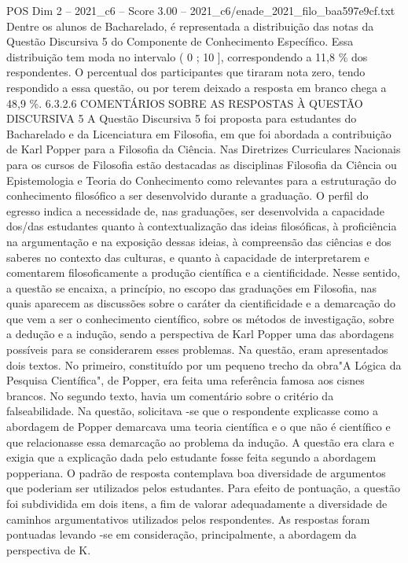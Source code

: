 \begin{textsample}{POS Dim 2 – 2021\_c6 – Score 3.00 – 2021\_c6/enade\_2021\_filo\_baa597e9cf.txt}
Dentre os alunos de Bacharelado, é representada a distribuição das notas da Questão Discursiva 5 do Componente de Conhecimento Específico.
Essa distribuição tem moda no intervalo ( 0 ; 10 ], correspondendo a 11,8 \% dos respondentes.
O percentual dos participantes que tiraram nota zero, tendo respondido a essa questão, ou por terem deixado a resposta em branco chega a 48,9 \%. 6.3.2.6 COMENTÁRIOS SOBRE AS RESPOSTAS À QUESTÃO DISCURSIVA 5 A Questão Discursiva 5 foi proposta para estudantes do Bacharelado e da Licenciatura em Filosofia, em que foi abordada a contribuição de Karl Popper para a Filosofia da Ciência.
Nas Diretrizes Curriculares Nacionais para os cursos de Filosofia estão destacadas as disciplinas Filosofia da Ciência ou Epistemologia e Teoria do Conhecimento como relevantes para a estruturação do conhecimento filosófico a ser desenvolvido durante a graduação.
O perfil do egresso indica a necessidade de, nas graduações, ser desenvolvida a capacidade dos/das estudantes quanto à contextualização das ideias filosóficas, à proficiência na argumentação e na exposição dessas ideias, à compreensão das ciências e dos saberes no contexto das culturas, e quanto à capacidade de interpretarem e comentarem filosoficamente a produção científica e a cientificidade.
Nesse sentido, a questão se encaixa, a princípio, no escopo das graduações em Filosofia, nas quais aparecem as discussões sobre o caráter da cientificidade e a demarcação do que vem a ser o conhecimento científico, sobre os métodos de investigação, sobre a dedução e a indução, sendo a perspectiva de Karl Popper uma das abordagens possíveis para se considerarem esses problemas.
Na questão, eram apresentados dois textos.
No primeiro, constituído por um pequeno trecho da obra"A Lógica da Pesquisa Científica", de Popper, era feita uma referência famosa aos cisnes brancos.
No segundo texto, havia um comentário sobre o critério da falseabilidade.
Na questão, solicitava -se que o respondente explicasse como a abordagem de Popper demarcava uma teoria científica e o que não é científico e que relacionasse essa demarcação ao problema da indução.
A questão era clara e exigia que a explicação dada pelo estudante fosse feita segundo a abordagem popperiana.
O padrão de resposta contemplava boa diversidade de argumentos que poderiam ser utilizados pelos estudantes.
Para efeito de pontuação, a questão foi subdividida em dois itens, a fim de valorar adequadamente a diversidade de caminhos argumentativos utilizados pelos respondentes.
As respostas foram pontuadas levando -se em consideração, principalmente, a abordagem da perspectiva de K.

\end{textsample}

